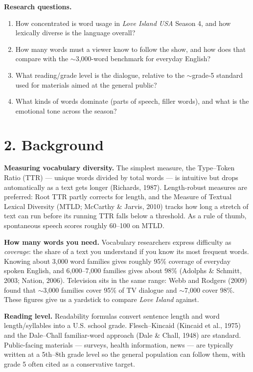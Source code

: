 \documentclass[11pt]{article}
\begin{document}
\textbf{Research questions.}

\begin{enumerate}
\item How concentrated is word usage in \emph{Love Island USA} Season 4, and how lexically diverse is the language overall?
\item How many words must a viewer know to follow the show, and how does that compare with the $\sim$3,000-word benchmark for everyday English?
\item What reading/grade level is the dialogue, relative to the $\sim$grade-5 standard used for materials aimed at the general public?
\item What kinds of words dominate (parts of speech, filler words), and what is the emotional tone across the season?
\end{enumerate}


\section*{2. Background}

\textbf{Measuring vocabulary diversity.} The simplest measure, the Type--Token Ratio (TTR) --- unique words divided by total words --- is intuitive but drops automatically as a text gets longer (Richards, 1987). Length-robust measures are preferred: Root TTR partly corrects for length, and the Measure of Textual Lexical Diversity (MTLD; McCarthy \& Jarvis, 2010) tracks how long a stretch of text can run before its running TTR falls below a threshold. As a rule of thumb, spontaneous speech scores roughly 60--100 on MTLD.

\textbf{How many words you need.} Vocabulary researchers express difficulty as \emph{coverage}: the share of a text you understand if you know its most frequent words. Knowing about 3,000 word families gives roughly 95\% coverage of everyday spoken English, and 6,000--7,000 families gives about 98\% (Adolphs \& Schmitt, 2003; Nation, 2006). Television sits in the same range: Webb and Rodgers (2009) found that $\sim$3,000 families cover 95\% of TV dialogue and $\sim$7,000 cover 98\%. These figures give us a yardstick to compare \emph{Love Island} against.

\textbf{Reading level.} Readability formulas convert sentence length and word length/syllables into a U.S. school grade. Flesch--Kincaid (Kincaid et al., 1975) and the Dale--Chall familiar-word approach (Dale \& Chall, 1948) are standard. Public-facing materials --- surveys, health information, news --- are typically written at a 5th--8th grade level so the general population can follow them, with grade 5 often cited as a conservative target.
\end{document}
